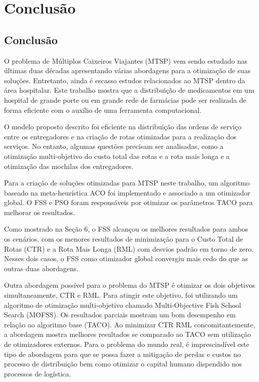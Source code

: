 \chapter{Conclusão}


\section{Conclusão}

O problema de Múltiplos Caixeiros Viajantes (MTSP) vem sendo estudado nas últimas duas décadas apresentando várias abordagens para a otimização de suas soluções. Entretanto, ainda é escasso estudos relacionados ao MTSP dentro da área hospitalar. Este trabalho mostra que a distribuição de medicamentos em um hospital de grande porte ou em grande rede de farmácias pode ser realizada de forma eficiente com o auxílio de uma ferramenta computacional.

O modelo proposto descrito foi eficiente na distribuição das ordens de serviço entre os entregadores e na criação de rotas otimizadas para a realização dos serviços. No entanto, algumas questões precisam ser analisadas, como a otimização multi-objetivo do custo total das rotas e a rota mais longa e a otimização das mochilas dos entregadores.

Para a criação de soluções otimizadas para MTSP neste trabalho, um algoritmo baseado na meta-heurística ACO foi implementado e associado a um otimizador global. O FSS e PSO foram responsáveis por otimizar os parâmetros TACO para melhorar os resultados.

Como mostrado na Seção 6, o FSS alcançou os melhores resultados para ambos os cenários, com os menores resultados de minimização para o Custo Total de Rotas (CTR) e a Rota Mais Longa (RML) com desvios padrão em torno de zero. Nesses dois casos, o FSS como otimizador global convergiu mais cedo do que as outras duas abordagens.

Outra abordagem possível para o problema do MTSP é otimizar os dois objetivos simultaneamente, CTR e RML. Para atingir este objetivo, foi utilizando um algoritmo de otimização multi-objetivo chamado Multi-Objective Fish School Search (MOFSS). Os resultados parciais mostram um bom desempenho em relação ao algoritmo base (TACO). Ao minimizar CTR RML concomitantemente, a abordagem mostra melhores resultados se comparado ao TACO sem utilização de otimizadores externos. Para o problema do mundo real, é imprescindível este tipo de abordagem para que se possa fazer a mitigação de perdas e custos no processo de distribuição bem como otimizar o capital humano dispendido nos processos de logística.

